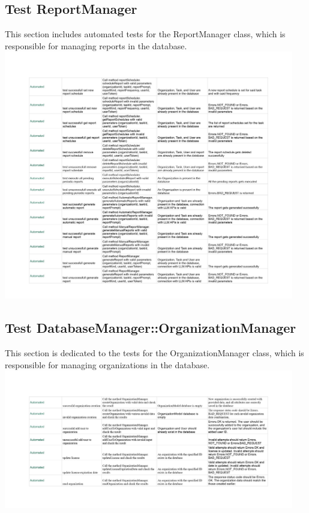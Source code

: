 \documentclass{article}
\begin{document}
\subsection*{Test ReportManager}
This section includes automated tests for the ReportManager class, which is responsible for managing reports in the database.
\newline
\includegraphics[width=0.95\textwidth]{images/Test_ReportManager.jpg}

\subsection*{Test DatabaseManager::OrganizationManager}
This section is dedicated to the tests for the OrganizationManager class, which is responsible for managing organizations in the database.
\newline
\includegraphics[width=0.95\textwidth]{images/Test_DatabaseManagerOrganizationManager.jpg}
\end{document}
